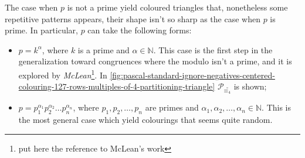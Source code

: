 The case when $p$ is not a prime yield coloured triangles that, nonetheless some 
repetitive patterns appears, their shape isn't so sharp as the case when $p$ is prime.
In particular, $p$ can take the following forms: 
\begin{itemize}
    \item $p=k^{\alpha}$, where $k$ is a prime and $\alpha\in\mathbb{N}$. This case
        is the first step in the generalization toward congruences where the modulo 
        isn't a prime, and it is explored by \emph{McLean}\footnote{put here the reference to McLean's work}.
        In \autoref{fig:pascal-standard-ignore-negatives-centered-colouring-127-rows-multiples-of-4-partitioning-triangle} 
        $\mathcal{P}_{\stackrel{\circ}{\equiv_{4}}}$ is shown;
    \item $p=p_{1}^{\alpha_{1}}p_{2}^{\alpha_{2}}\ldots p_{n}^{\alpha_{n}}$, where $p_{1},p_{2},\ldots,p_{n}$ 
        are primes and $\alpha_{1},\alpha_{2},\ldots,\alpha_{n}\in\mathbb{N}$. This is the most general case
        which yield colourings that seems quite random.
\end{itemize}

